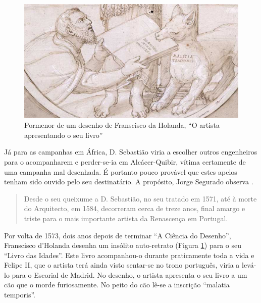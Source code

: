 \documentclass{article}
\begin{document}
\begin{figure}
\centering\includegraphics[height=0.3\textheight,keepaspectratio]
                          {images/malatia-temporis.png}
  \caption{Pormenor de um desenho de Franscisco da Holanda, ``O
    artista apresentando o seu livro''}
  \label{fig:1}
\end{figure}

Já para as campanhas em África, D. Sebastião viria a escolher outros %
engenheiros para o acompanharem \cite[notas,p.54]{holanda} e
perder-se-ia em Alcácer-Quibir, vítima certamente de uma campanha mal
desenhada. É portanto pouco provável que estes apelos tenham sido
ouvido pelo seu destinatário. A propósito, Jorge Segurado observa
\cite{segurado}.

\begin{quote}
  Desde o seu queixume a D. Sebastião, no seu tratado em 1571, até à
  morte do Arquitecto, em 1584, decorreram cerca de treze anos, final
  amargo e triste para o mais importante artista da Renascença em
  Portugal.
\end{quote}

Por volta de 1573, dois anos depois de terminar ``A Ciência do
Desenho'', Franscisco d'Holanda desenha um insólito auto-retrato
(Figura \ref{fig:1}) para o seu ``Livro das Idades''. Este livro
acompanhou-o durante praticamente toda a vida e Felipe II, que o
artista terá ainda visto sentar-se no trono português, viria a levá-lo
para o Escorial de Madrid. No desenho, o artista apresenta o seu livro
a um cão que o morde furiosamente. No peito do cão lê-se a inscrição
``malatia temporis''.

\printbibliography[heading=bibliography,title={Bibliografia}]
\end{document}
